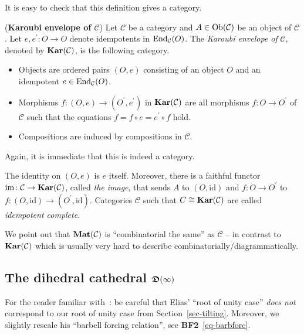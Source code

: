 It is easy to check that this definition gives a category.



\begin{defnn}(\textbf{Karoubi envelope of $\mathcal C$})\label{defn-karoubi}
Let $\mathcal C$ be a category and 
$A\in\mathrm{Ob}(\mathcal C)$ be an object of 
$\mathcal C$. Let $e,e^{\prime}\colon O\to O$ 
denote idempotents in $\mathrm{End}_{\mathcal C}(O)$. 
The \textit{Karoubi envelope of} $\mathcal C$, 
denoted by $\boldsymbol{\mathrm{Kar}}(\mathcal C)$, is the following category.
\begin{itemize}
\item Objects are ordered pairs $(O,e)$ 
consisting of an object $O$ and an idempotent $e\in\mathrm{End}_{\mathcal C}(O)$.
\item Morphisms 
$f\colon(O,e)\to(O^{\prime},e^{\prime})$ in $\boldsymbol{\mathrm{Kar}}(\mathcal C)$ 
are all morphisms $f\colon O\to O^{\prime}$ of $\mathcal C$ such that the equations $f=f\circ e=e^{\prime}\circ f$ hold.
\item Compositions are induced by compositions in $\mathcal C$.\maketriqed
\end{itemize}
\end{defnn}

Again, it is immediate that this 
is indeed a category.


The 
identity on $(O,e)$ is $e$ itself. 
Moreover, there is a faithful functor 
$\mathrm{im}\colon \mathcal C\to\boldsymbol{\mathrm{Kar}}(\mathcal C)$,
called \textit{the image}, that sends $A$ to 
$(O,\mathrm{id})$ and $f\colon O\to O^{\prime}$ 
to $f\colon(O,\mathrm{id})\to(O^{\prime},\mathrm{id})$.
Categories $\mathcal C$ such that $C\cong\boldsymbol{\mathrm{Kar}}(\mathcal C)$ 
are called \textit{idempotent complete}.


We point out that $\boldsymbol{\mathrm{Mat}}(\mathcal{C})$ 
is ``combinatorial the same'' as $\mathcal{C}$ -- in contrast to 
$\boldsymbol{\mathrm{Kar}}(\mathcal{C})$ which is usually very hard to describe 
combinatorially/diagrammatically.



\subsection{The dihedral cathedral \texorpdfstring{$\boldsymbol{\mathfrak{D}}(\infty)$}{Dinfty}}\label{sub-dcath}
For the reader familiar with~\cite{el1}: be careful that Elias' 
``root of unity case'' \textit{does not} 
correspond to our root of unity case from Section~\ref{sec-tilting}. 
Moreover, we slightly rescale his 
``barbell forcing relation'', see \textbf{BF2}~\eqref{eq-barbforc}.



